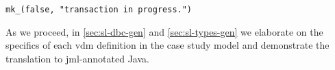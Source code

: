 \begin{lstlisting}[style=racOutput,caption={System output after fixing
the problem in
\autoref{lst:jmlScenario}.},label={lst:racOutputSuccess}]
mk_(false, "transaction in progress.")
\end{lstlisting}

As we proceed, in \autoref{sec:sl-dbc-gen} and
\autoref{sec:sl-types-gen} we elaborate on the specifics of each
\ac{vdm} definition in the case study model and demonstrate the
translation to \ac{jml}-annotated Java.

